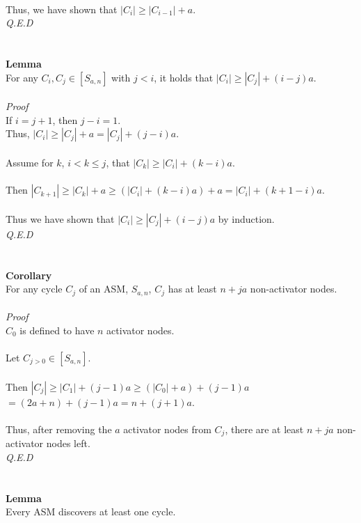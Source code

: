 \documentclass[a4paper,12pt]{article}
\begin{document}
\\
Thus, we have shown that  $|C_{i}| \geq |C_{i-1}| + a$.\\
\textit{Q.E.D}\\
\\
\\
\textbf{Lemma}\\
For any $C_i, C_j \in [S_{a,n}]$ with $j < i$, it holds that $|C_{i}| \geq |C_j| + (i - j)a$.\\
\\
\textit{Proof}\\ 
If $i = j + 1$, then $j - i = 1$.\\
Thus, $|C_i| \geq |C_j| + a = |C_j| + (j - i)a$.\\
\\
Assume for $k$, $i < k \leq j$, that $|C_k| \geq |C_i| + (k-i)a$.\\
\\
Then $|C_{k+1}| \geq |C_k| + a \geq (|C_i| + (k-i)a) + a = |C_i| + (k + 1 - i)a$.\\
\\
Thus we have shown that $|C_{i}| \geq |C_j| + (i - j)a$ by induction.\\
\textit{Q.E.D}\\
\\
\\
\textbf{Corollary}\\
For any cycle $C_{j}$ of an ASM, $S_{a,n}$, $C_j$ has at least $n + ja$ non-activator nodes.\\
\\
\textit{Proof}\\
$C_0$ is defined to have $n$ activator nodes.\\
\\
Let $C_{j>0} \in [S_{a,n}]$.\\
\\
Then $|C_j| \geq |C_1| + (j-1)a \geq (|C_0| + a) + (j-1)a $\\
$= (2a + n) + (j-1)a = n + (j+1)a$.\\
\\
Thus, after removing the $a$ activator nodes from $C_j$, there are at least $n + ja$ non-activator nodes left.\\
\textit{Q.E.D}\\
\\
\\
\textbf{Lemma}\\
Every ASM discovers at least one cycle.\\
\\
\end{document}
